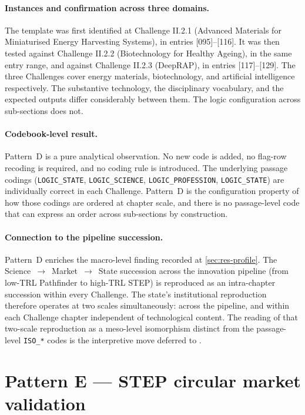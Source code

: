 \paragraph{Instances and confirmation across three domains.}
The template was first identified at Challenge II.2.1 (Advanced
Materials for Miniaturised Energy Harvesting Systems), in entries
[095]--[116]. It was then tested against Challenge II.2.2
(Biotechnology for Healthy Ageing), in the same entry range, and
against Challenge II.2.3 (DeepRAP), in entries [117]--[129]. The
three Challenges cover energy materials, biotechnology, and
artificial intelligence respectively. The substantive technology, the
disciplinary vocabulary, and the expected outputs differ
considerably between them. The logic configuration across
sub-sections does not.

\paragraph{Codebook-level result.}
Pattern~D is a pure analytical observation. No new code is added, no
flag-row recoding is required, and no coding rule is introduced. The
underlying passage codings (\texttt{LOGIC\_STATE},
\texttt{LOGIC\_SCIENCE}, \texttt{LOGIC\_PROFESSION},
\texttt{LOGIC\_STATE}) are individually correct in each Challenge.
Pattern~D is the configuration property of how those codings are
ordered at chapter scale, and there is no passage-level code that
can express an order across sub-sections by construction.

\paragraph{Connection to the pipeline succession.}
Pattern~D enriches the macro-level finding recorded at
\cref{sec:res-profile}. The Science~$\to$~Market~$\to$~State
succession across the innovation pipeline (from low-TRL Pathfinder
to high-TRL STEP) is reproduced as an intra-chapter succession
within every Challenge. The state's institutional reproduction
therefore operates at two scales simultaneously: across the
pipeline, and within each Challenge chapter independent of
technological content. The reading of that two-scale reproduction as
a meso-level isomorphism distinct from the passage-level
\texttt{ISO\_*} codes is the interpretive move deferred to
.

\section{Pattern E --- STEP circular market validation}
\label{sec:res-pattern-e}


